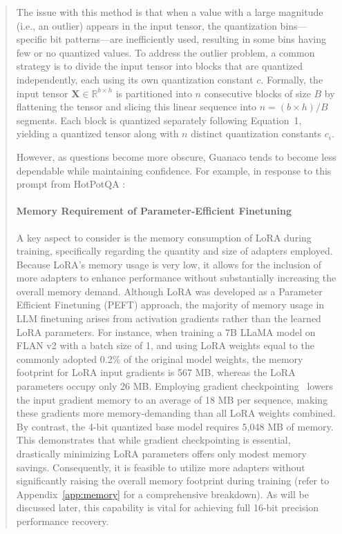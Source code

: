 \begin{quote}
The issue with this method is that when a value with a large magnitude (i.e., an outlier) appears in the input tensor, the quantization bins—specific bit patterns—are inefficiently used, resulting in some bins having few or no quantized values. To address the outlier problem, a common strategy is to divide the input tensor into blocks that are quantized independently, each using its own quantization constant $c$. Formally, the input tensor $\mathbf{X}\in \mathbb{R}^{b\times h}$ is partitioned into $n$ consecutive blocks of size $B$ by flattening the tensor and slicing this linear sequence into ${n = ({b\times h} )/{B}}$ segments. Each block is quantized separately following Equation~1, yielding a quantized tensor along with $n$ distinct quantization constants $c_i$.

However, as questions become more obscure, {Guanaco} tends to become less dependable while maintaining confidence. For example, in response to this prompt from HotPotQA \citep{yang2018hotpotqa}:  

\paragraph{Memory Requirement of Parameter-Efficient Finetuning} A key aspect to consider is the memory consumption of LoRA during training, specifically regarding the quantity and size of adapters employed. Because LoRA's memory usage is very low, it allows for the inclusion of more adapters to enhance performance without substantially increasing the overall memory demand. Although LoRA was developed as a Parameter Efficient Finetuning (PEFT) approach, the majority of memory usage in LLM finetuning arises from activation gradients rather than the learned LoRA parameters. For instance, when training a 7B LLaMA model on FLAN v2 with a batch size of 1, and using LoRA weights equal to the commonly adopted 0.2\% of the original model weights\citep{hu2021lora,liu2022few}, the memory footprint for LoRA input gradients is 567 MB, whereas the LoRA parameters occupy only 26 MB. Employing gradient checkpointing~\citep{chen2016training} lowers the input gradient memory to an average of 18 MB per sequence, making these gradients more memory-demanding than all LoRA weights combined. By contrast, the 4-bit quantized base model requires 5,048 MB of memory. This demonstrates that while gradient checkpointing is essential, drastically minimizing LoRA parameters offers only modest memory savings. Consequently, it is feasible to utilize more adapters without significantly raising the overall memory footprint during training (refer to Appendix~\ref{app:memory} for a comprehensive breakdown). As will be discussed later, this capability is vital for achieving full 16-bit precision performance recovery.


\end{quote}
